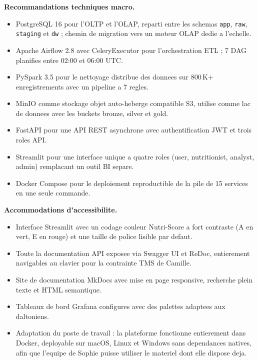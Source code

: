 \documentclass[a4paper,11pt,oneside,openany]{report}
\begin{document}
\textbf{Recommandations techniques macro.}
\begin{itemize}[nosep]
  \item PostgreSQL 16 pour l'OLTP et l'OLAP, reparti entre les
        schemas \texttt{app}, \texttt{raw}, \texttt{staging} et
        \texttt{dw} ; chemin de migration vers un moteur OLAP
        dedie a l'echelle.
  \item Apache Airflow 2.8 avec CeleryExecutor pour l'orchestration
        ETL ; 7 DAG planifies entre 02:00 et 06:00 UTC.
  \item PySpark 3.5 pour le nettoyage distribue des donnees sur
        800\,K+ enregistrements avec un pipeline a 7 regles.
  \item MinIO comme stockage objet auto-heberge compatible S3,
        utilise comme lac de donnees avec les buckets bronze, silver
        et gold.
  \item FastAPI pour une API REST asynchrone avec authentification
        JWT et trois roles API.
  \item Streamlit pour une interface unique a quatre roles (user,
        nutritionist, analyst, admin) remplacant un outil BI separe.
  \item Docker Compose pour le deploiement reproductible de la pile
        de 15 services en une seule commande.
\end{itemize}

\textbf{Accommodations d'accessibilite.}
\begin{itemize}[nosep]
  \item Interface Streamlit avec un codage couleur Nutri-Score a fort
        contraste (A en vert, E en rouge) et une taille de police
        lisible par defaut.
  \item Toute la documentation API exposee via Swagger UI et ReDoc,
        entierement navigables au clavier pour la contrainte TMS de
        Camille.
  \item Site de documentation MkDocs avec mise en page responsive,
        recherche plein texte et HTML semantique.
  \item Tableaux de bord Grafana configures avec des palettes
        adaptees aux daltoniens.
  \item Adaptation du poste de travail : la plateforme fonctionne
        entierement dans Docker, deployable sur macOS, Linux et
        Windows sans dependances natives, afin que l'equipe de Sophie
        puisse utiliser le materiel dont elle dispose deja.
\end{itemize}
\end{document}
